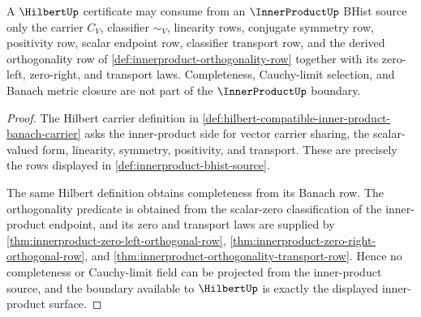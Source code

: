 \begin{theorem}
\label{thm:innerproduct-hilbert-boundary-row}
A $\HilbertUp$ certificate may consume from an $\InnerProductUp$ BHist source
only the carrier $C_V$, classifier $\sim_V$, linearity rows, conjugate
symmetry row, positivity row, scalar endpoint row, classifier transport row,
and the derived orthogonality row of
\autoref{def:innerproduct-orthogonality-row} together with its zero-left,
zero-right, and transport laws. Completeness, Cauchy-limit selection, and
Banach metric closure are not part of the $\InnerProductUp$ boundary.
\end{theorem}
\begin{proof}
The Hilbert carrier definition in
\autoref{def:hilbert-compatible-inner-product-banach-carrier} asks the
inner-product side for vector carrier sharing, the scalar-valued form,
linearity, symmetry, positivity, and transport. These are precisely the rows
displayed in \autoref{def:innerproduct-bhist-source}.

The same Hilbert definition obtains completeness from its Banach row. The
orthogonality predicate is obtained from the scalar-zero classification of
the inner-product endpoint, and its zero and transport laws are supplied by
\autoref{thm:innerproduct-zero-left-orthogonal-row},
\autoref{thm:innerproduct-zero-right-orthogonal-row}, and
\autoref{thm:innerproduct-orthogonality-transport-row}. Hence no
completeness or Cauchy-limit field can be projected from the inner-product
source, and the boundary available to $\HilbertUp$ is exactly the displayed
inner-product surface.
\end{proof}

